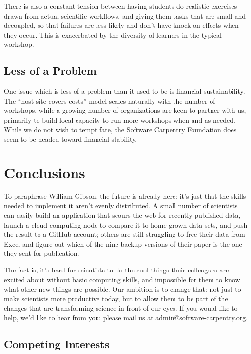 \documentclass[10pt,a4paper,twocolumn]{article}
\begin{document}
There is also a constant tension between having students do realistic
exercises drawn from actual scientific workflows, and giving them tasks
that are small and decoupled, so that failures are less likely and don't
have knock-on effects when they occur. This is exacerbated by the
diversity of learners in the typical workshop.

\subsection{Less of a Problem}

One issue which is less of a problem than it used to be is financial
sustainability. The ``host site covers costs'' model scales naturally
with the number of workshops, while a growing number of organizations
are keen to partner with us, primarily to build local capacity to run
more workshops when and as needed.  While we do not wish to tempt
fate, the Software Carpentry Foundation does seem to be headed toward
financial stability.

\section{Conclusions}

To paraphrase William Gibson, the future is already here: it's just
that the skills needed to implement it aren't evenly distributed. A
small number of scientists can easily build an application that scours
the web for recently-published data, launch a cloud computing node to
compare it to home-grown data sets, and push the result to a GitHub
account; others are still struggling to free their data from Excel and
figure out which of the nine backup versions of their paper is the one
they sent for publication.

The fact is, it's hard for scientists to do the cool things their
colleagues are excited about without basic computing skills, and
impossible for them to know what other new things are possible. Our
ambition is to change that: not just to make scientists more productive
today, but to allow them to be part of the changes that are transforming
science in front of our eyes. If you would like to help, we'd like to
hear from you: please mail us at admin@software-carpentry.org.

\subsection{Competing Interests}
\end{document}
